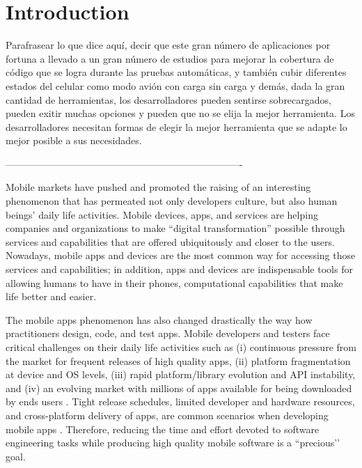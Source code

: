 
\chapter{Introduction} %

\label{Chapter1} %
 
Parafrasear lo que dice aquí, decir que este gran número de aplicaciones por fortuna a llevado a un gran número de estudios para mejorar la cobertura de código que se logra durante las pruebas automáticas, y también cubir diferentes estados del celular como modo avión con carga sin carga y demás, dada la gran cantidad de herramientas, los desarrolladores pueden sentirse sobrecargados, pueden exitir muchas opciones y pueden que no se elija la mejor herramienta. 
Los desarrolladores necesitan formas de elegir la mejor herramienta que se adapte lo mejor posible a sus necesidades.

-------------------------------------------------------------------------
 
Mobile markets have pushed and promoted the raising of an interesting phenomenon that has permeated not only developers culture, but also human beings’ daily life activities. Mobile devices, apps, and services are helping companies and organizations to make “digital transformation” possible through services and capabilities that are offered ubiquitously and closer to the users. Nowadays, mobile apps and devices are the most common way for accessing those services and capabilities; in addition, apps and devices are indispensable tools for allowing humans to have in their phones, computational capabilities that make life better and easier.

The mobile apps phenomenon has also changed drastically the way how practitioners design, code, and test apps.  Mobile developers and testers face critical challenges on their daily life activities such as (i) continuous pressure from the market for frequent releases of high quality apps, (ii) platform fragmentation at device and OS levels, (iii) rapid platform/library evolution and API instability, and (iv) an evolving market with millions of apps available for being downloaded by ends users \cite{joorabchi2013real,palomba2018crowdsourcing}. Tight release schedules, limited developer and hardware resources, and cross-platform delivery of apps, are common scenarios when developing mobile apps \cite{joorabchi2013real}. Therefore, reducing the time and effort devoted to software engineering tasks while producing high quality mobile software is a ``precious’’ goal.


